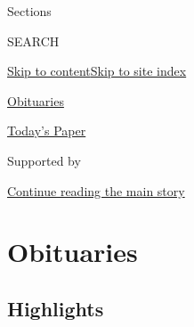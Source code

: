 Sections

SEARCH

\protect\hyperlink{site-content}{Skip to
content}\protect\hyperlink{site-index}{Skip to site index}

\href{https://www.nytimes.com/section/obituaries}{Obituaries}

\href{https://myaccount.nytimes.com/auth/login?response_type=cookie\&client_id=vi}{}

\href{https://www.nytimes.com/section/todayspaper}{Today's Paper}

Supported by

\protect\hyperlink{after-sponsor}{Continue reading the main story}

\hypertarget{obituaries}{%
\section{Obituaries}\label{obituaries}}

\hypertarget{highlights}{%
\subsection{Highlights}\label{highlights}}

